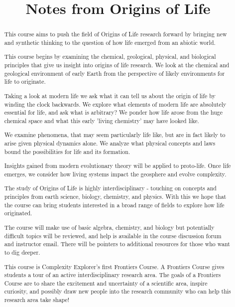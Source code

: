\documentclass[]{article}
\title{Notes from Origins of Life}
\author{}
\begin{document}
\maketitle


\begin{abstract}
    This course aims to push the field of Origins of Life research forward by bringing new and synthetic thinking to the question of how life emerged from an abiotic world.

This course begins by examining the chemical, geological, physical, and biological principles that give us insight into origins of life research. We look at the chemical and geological environment of early Earth from the perspective of likely environments for life to originate.

Taking a look at modern life we ask what it can tell us about the origin of life by winding the clock backwards. We explore what elements of modern life are absolutely essential for life, and ask what is arbitrary? We ponder how life arose from the huge chemical space and what this early 'living chemistry' may have looked like.

We examine phenomena, that may seem particularly life like, but are in fact likely to arise given physical dynamics alone. We analyze what physical concepts and laws bound the possibilities for life and its formation.

Insights gained from modern evolutionary theory will be applied to proto-life. Once life emerges, we consider how living systems impact the geosphere and evolve complexity. 

The study of Origins of Life is highly interdisciplinary - touching on concepts and principles from earth science, biology, chemistry, and physics.  With this we hope that the course can bring students interested in a broad range of fields to explore how life originated. 

The course will make use of basic algebra, chemistry, and biology but potentially difficult topics will be reviewed, and help is available in the course discussion forum and instructor email. There will be pointers to additional resources for those who want to dig deeper.

This course is Complexity Explorer's first Frontiers Course.  A Frontiers Course gives students a tour of an active interdisciplinary research area. The goals of a Frontiers Course are to share the excitement and uncertainty of a scientific area, inspire curiosity, and possibly draw new people into the research community who can help this research area take shape!

\end{abstract}
\end{document}
